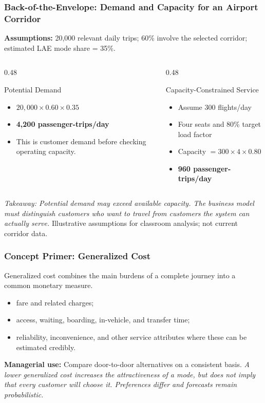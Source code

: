 \documentclass{beamer}
\begin{document}
\begin{frame}[t,shrink=12]
\frametitle{Back-of-the-Envelope: Demand and Capacity for an Airport Corridor}
\textbf{Assumptions:} 20,000 relevant daily trips; 60\% involve the selected corridor; estimated LAE mode share = 35\%.
\begin{columns}[T]
\begin{column}{0.48\textwidth}\begin{block}{Potential Demand}
\begin{itemize}
\item $20{,}000\times0.60\times0.35$
\item \textbf{4,200 passenger-trips/day}
\item This is customer demand before checking operating capacity.
\end{itemize}\end{block}\end{column}
\begin{column}{0.48\textwidth}\begin{block}{Capacity-Constrained Service}
\begin{itemize}
\item Assume 300 flights/day
\item Four seats and 80\% target load factor
\item Capacity $=300\times4\times0.80$
\item \textbf{960 passenger-trips/day}
\end{itemize}\end{block}\end{column}
\end{columns}
\textit{Takeaway: Potential demand may exceed available capacity. The business model must distinguish customers who want to travel from customers the system can actually serve.}
\vfill{\tiny Illustrative assumptions for classroom analysis; not current corridor data.}
\end{frame}

\begin{frame}[t]
\frametitle{Concept Primer: Generalized Cost}
Generalized cost combines the main burdens of a complete journey into a common monetary measure.
\begin{itemize}
\item fare and related charges;
\item access, waiting, boarding, in-vehicle, and transfer time;
\item reliability, inconvenience, and other service attributes where these can be estimated credibly.
\end{itemize}
\textbf{Managerial use:} Compare door-to-door alternatives on a consistent basis.
\vspace{0.25cm}
\textit{A lower generalized cost increases the attractiveness of a mode, but does not imply that every customer will choose it. Preferences differ and forecasts remain probabilistic.}
\end{frame}
\end{document}
